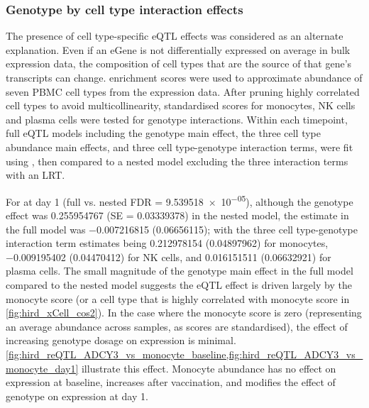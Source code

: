 
\subsubsection{Genotype by cell type interaction effects}

The presence of cell type-specific \gls{eQTL} effects was considered as an alternate explanation.
Even if an eGene is not differentially expressed on average in bulk expression data, 
the composition of cell types that are the source of that gene's transcripts can change.
 enrichment scores were used to approximate abundance of seven \gls{PBMC} cell types from the expression data.
After pruning highly correlated cell types to avoid multicollinearity, standardised scores for monocytes, \gls{NK} cells and plasma cells were tested for genotype interactions.
Within each timepoint, full \gls{eQTL} models including the genotype main effect, the three cell type abundance main effects, and three cell type-genotype interaction terms, were fit using , 
then compared to a nested model excluding the three interaction terms with an \gls{LRT}.

For  at day 1 (full vs. nested \gls{FDR} = \num{9.539518e-05}),
although the genotype effect was \num{0.255954767} (SE = \num{0.03339378}) in the nested model,
the estimate in the full model was \num{-0.007216815} (\num{0.06656115});
with the three cell type-genotype interaction term estimates being
\num{0.212978154} (\num{0.04897962}) for monocytes,
\num{-0.009195402} (\num{0.04470412}) for \gls{NK} cells,
and \num{0.016151511} (\num{0.06632921}) for plasma cells.
The small magnitude of the genotype main effect in the full model compared to the nested model suggests the \gls{eQTL} effect is driven largely by the monocyte score (or a cell type that is highly correlated with monocyte score in \cref{fig:hird_xCell_cos2}).
In the case where the monocyte score is zero (representing an average abundance across samples, as scores are standardised), the effect of increasing genotype dosage on  expression is minimal.
\cref{fig:hird_reQTL_ADCY3_vs_monocyte_baseline,fig:hird_reQTL_ADCY3_vs_monocyte_day1} illustrate this effect.
Monocyte abundance has no effect on expression at baseline, 
increases after vaccination, and modifies the effect of genotype on expression at day 1.

